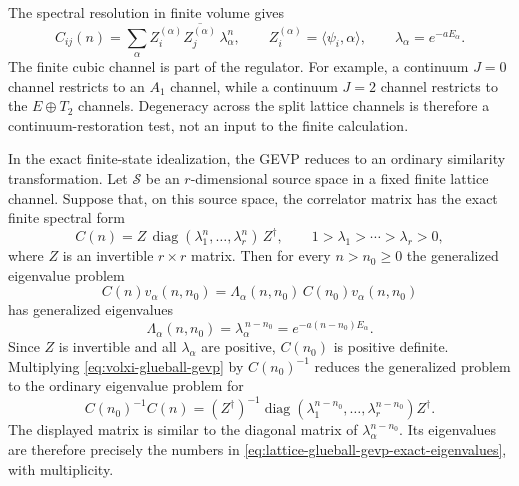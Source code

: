 The spectral resolution in finite volume gives
\begin{equation}
  C_{ij}(n)
  =
  \sum_{\alpha}
  Z_i^{(\alpha)}\overline{Z_j^{(\alpha)}}\,
  \lambda_\alpha^n,
  \qquad
  Z_i^{(\alpha)}=\langle\psi_i,\alpha\rangle ,
  \qquad
  \lambda_\alpha=e^{-aE_\alpha}.
  \label{eq:volxi-glueball-spectral-matrix}
\end{equation}
The finite cubic channel is part of the regulator.  For example, a continuum
\(J=0\) channel restricts to an \(A_1\) channel, while a continuum \(J=2\)
channel restricts to the \(E\oplus T_2\) channels.  Degeneracy across the
split lattice channels is therefore a continuum-restoration test, not an
input to the finite calculation.

In the exact finite-state idealization, the GEVP reduces to an ordinary
similarity transformation.  Let \(\mathcal S\) be an \(r\)-dimensional source
space in a fixed finite
lattice channel.  Suppose that, on this source space, the correlator matrix
has the exact finite spectral form
\begin{equation}
  C(n)=Z\,\operatorname{diag}
  (\lambda_1^n,\ldots,\lambda_r^n)\,Z^\dagger ,
  \qquad
  1>\lambda_1>\cdots>\lambda_r>0,
  \label{eq:lattice-glueball-exact-finite-spectrum}
\end{equation}
where \(Z\) is an invertible \(r\times r\) matrix.  Then for every
\(n>n_0\ge0\) the generalized eigenvalue problem
\begin{equation}
  C(n)v_\alpha(n,n_0)
  =
  \Lambda_\alpha(n,n_0)\,C(n_0)v_\alpha(n,n_0)
  \label{eq:volxi-glueball-gevp}
\end{equation}
has generalized eigenvalues
\begin{equation}
  \Lambda_\alpha(n,n_0)=\lambda_\alpha^{\,n-n_0}
  =
  e^{-a(n-n_0)E_\alpha}.
  \label{eq:lattice-glueball-gevp-exact-eigenvalues}
\end{equation}
Since \(Z\) is invertible and all \(\lambda_\alpha\) are positive,
\(C(n_0)\) is positive definite.  Multiplying
\eqref{eq:volxi-glueball-gevp} by \(C(n_0)^{-1}\) reduces the generalized
problem to the ordinary eigenvalue problem for
\begin{equation}
  C(n_0)^{-1}C(n)
  =
  (Z^\dagger)^{-1}
  \operatorname{diag}
  (\lambda_1^{n-n_0},\ldots,\lambda_r^{n-n_0})
  Z^\dagger .
  \label{eq:lattice-glueball-gevp-similar-diagonal}
\end{equation}
The displayed matrix is similar to the diagonal matrix of
\(\lambda_\alpha^{n-n_0}\).  Its eigenvalues are therefore precisely the
numbers in \eqref{eq:lattice-glueball-gevp-exact-eigenvalues}, with
multiplicity.

